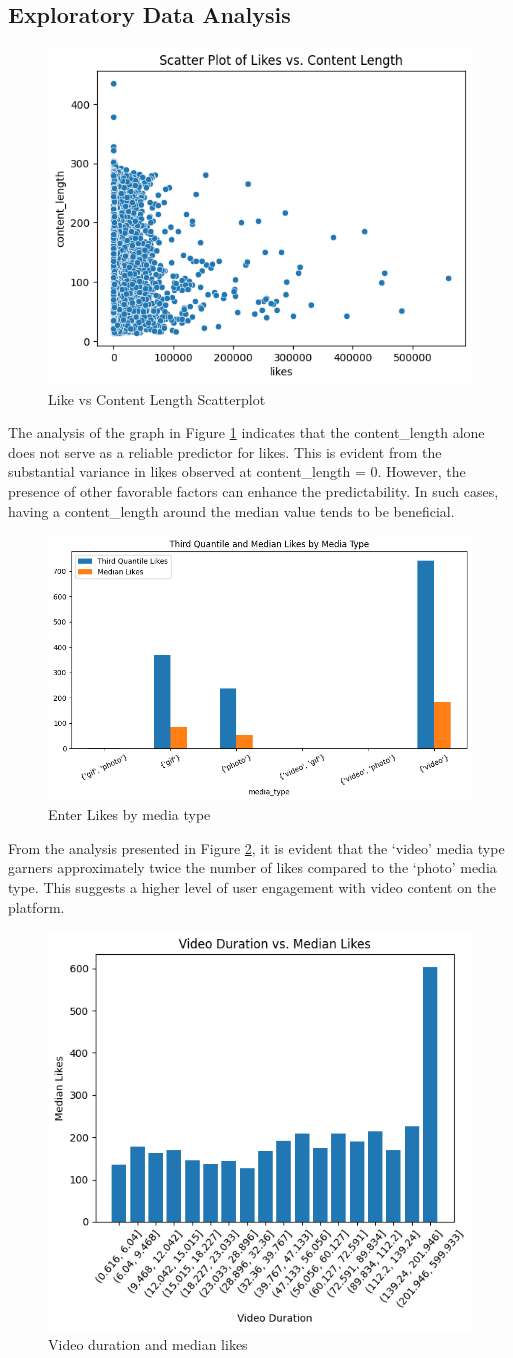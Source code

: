 \documentclass[11pt,a4paper]{article}
\begin{document}
\subsection{Exploratory Data Analysis}
\begin{figure}
    \centering
    \includegraphics[width=0.5\linewidth]{likes_vs_content.png}
    \caption{Like vs Content Length Scatterplot}
    \label{fig:scatter1}
\end{figure}
The analysis of the graph in Figure \ref{fig:scatter1} indicates that the content\_length alone does not serve as a reliable predictor for likes. This is evident from the substantial variance in likes observed at content\_length = 0. However, the presence of other favorable factors can enhance the predictability. In such cases, having a content\_length around the median value tends to be beneficial.
\begin{figure}
    \centering
    \includegraphics[width=0.5\linewidth]{likes_by_media_type.png}
    \caption{Enter Likes by media type}
    \label{fig:likes_media}
\end{figure}

From the analysis presented in Figure \ref{fig:likes_media}, it is evident that the ‘video’ media type garners approximately twice the number of likes compared to the ‘photo’ media type. This suggests a higher level of user engagement with video content on the platform.

\begin{figure}
    \centering
    \includegraphics[width=0.5\linewidth]{duration_median.png}
    \caption{Video duration and median likes}
    \label{fig:duration_median}
\end{figure}
\end{document}
